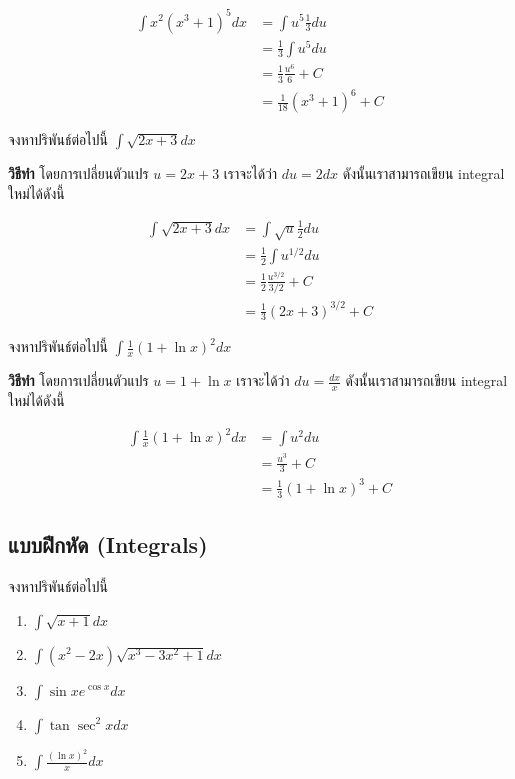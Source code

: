 \documentclass[
]{book}
\begin{document}
\[
\begin{aligned}
        \int x^2 (x^3 + 1)^5 dx &= \int u^5 \frac{1}{3} du \\
                                &= \frac{1}{3}\int u^5 du\\
                                &= \frac{1}{3} \frac{u^6}{6} + C\\
                                &= \frac{1}{18} (x^3+1)^6 + C
\end{aligned}
\]

จงหาปริพันธ์ต่อไปนี้ \(\int \sqrt{2x + 3} dx\)

\textbf{วิธีทำ} โดยการเปลี่ยนตัวแปร \(u = 2x + 3\) เราจะได้ว่า \(du = 2 dx\)
ดังนั้นเราสามารถเขียน integral ใหม่ได้ดังนี้

\begin{equation}
\begin{aligned}
        \int \sqrt{2x + 3} dx  &= \int \sqrt{u} \frac{1}{2} du \\
                                &= \frac{1}{2}\int u^{1/2} du\\
                                &= \frac{1}{2} \frac{ u^{3/2}}{3/2} + C\\
                                &= \frac{1}{3} (2x + 3)^{3/2} + C
\end{aligned}
\end{equation}

จงหาปริพันธ์ต่อไปนี้ \(\int \frac{1}{x} (1+ \ln x)^2 dx\)

\textbf{วิธีทำ} โดยการเปลี่ยนตัวแปร \(u = 1 + \ln x\) เราจะได้ว่า
\(du =  \frac{dx}{x}\) ดังนั้นเราสามารถเขียน integral ใหม่ได้ดังนี้

\begin{equation}
\begin{aligned}
        \int \frac{1}{x} (1+ \ln x)^2 dx  &= \int u^2 du \\
                                &= \frac{u^3}{3} + C\\
                                &= \frac{1}{3} (1 + \ln x)^3 + C
\end{aligned}
\end{equation}

\subsection{แบบฝึกหัด
(Integrals)}\label{uxe41uxe1auxe1auxe1duxe01uxe2buxe14-integrals}

จงหาปริพันธ์ต่อไปนี้

\begin{enumerate}
\def\labelenumi{\arabic{enumi}.}
\item
  \(\int \sqrt{x+1} dx\)
\item
  \(\int (x^2 - 2x) \sqrt{x^3 - 3x^2 +1} dx\)
\item
  \(\int \sin x e^{\cos x} dx\)
\item
  \(\int \tan \sec^2 x dx\)
\item
  \(\int \frac{(\ln x)^2}{x} dx\)
\end{enumerate}
\end{document}
